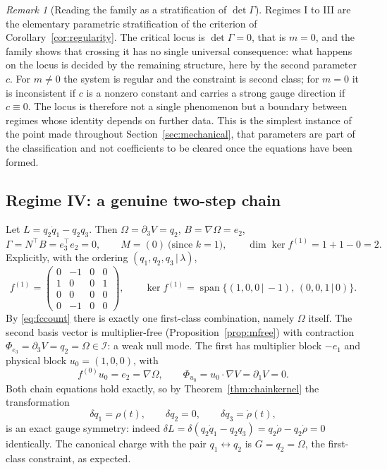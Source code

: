 \documentclass[12pt]{article}
\theoremstyle{plain}
\theoremstyle{definition}
\theoremstyle{remark}
\newtheorem{remark}[theorem]{Remark}
\DeclareMathOperator{\spn}{span}
\newcommand{\pd}[1]{\partial_{#1}}
\newcommand{\Om}{\Omega}
\newcommand{\Ical}{\mathcal{I}}
\begin{document}
	\begin{remark}[Reading the family as a stratification of $\det\Gamma$]
		\label{rem:familystrat}
		Regimes I to III are the elementary parametric stratification of the
		criterion of Corollary~\ref{cor:regularity}. The critical locus is
		$\det\Gamma=0$, that is $m=0$, and the family shows that crossing it has no
		single universal consequence: what happens on the locus is decided by the
		remaining structure, here by the second parameter $c$. For $m\neq0$ the
		system is regular and the constraint is second class; for $m=0$ it is
		inconsistent if $c$ is a nonzero constant and carries a strong gauge
		direction if $c\equiv0$. The locus is therefore not a single phenomenon but
		a boundary between regimes whose identity depends on further data. This is
		the simplest instance of the point made throughout
		Section~\ref{sec:mechanical}, that parameters are part of the classification
		and not coefficients to be cleared once the equations have been formed.
	\end{remark}
	
	\subsection{Regime IV: a genuine two-step chain}
	\label{sec:regimeIV}
	
	Let $L=q_{2}\dot q_{1}-q_{2}q_{3}$. Then $\Om=\pd{3}V=q_{2}$,
	$B=\nabla\Om=e_{2}$,
	\[
	\Gamma=N^{\top}B=e_{3}^{\top}e_{2}=0,
	\qquad
	M=(0)\ \text{(since }k=1),
	\qquad
	\dim\ker f^{(1)}=1+1-0=2 .
	\]
	Explicitly, with the ordering $(q_{1},q_{2},q_{3}\,|\,\lambda)$,
	\[
	f^{(1)}=\begin{pmatrix}0&-1&0&0\\1&0&0&1\\0&0&0&0\\0&-1&0&0\end{pmatrix},
	\qquad
	\ker f^{(1)}=\spn\{(1,0,0\,|\,-1),\,(0,0,1\,|\,0)\}.
	\]
	By \eqref{eq:fccount} there is exactly one first-class combination, namely $\Om$
	itself. The second basis vector is multiplier-free
	(Proposition~\ref{prop:mfree}) with contraction
	$\Phi_{e_{3}}=\pd{3}V=q_{2}=\Om\in\Ical$: a weak null mode. The first has
	multiplier block $-e_{1}$ and physical block $u_{0}=(1,0,0)$, with
	\[
	f^{(0)}u_{0}=e_{2}=\nabla\Om,
	\qquad
	\Phi_{u_{0}}=u_{0}\cdot\nabla V=\pd{1}V=0 .
	\]
	Both chain equations hold exactly, so by Theorem~\ref{thm:chainkernel} the
	transformation
	\begin{equation}
		\delta q_{1}=\rho(t),
		\qquad
		\delta q_{2}=0,
		\qquad
		\delta q_{3}=\dot\rho(t),
		\label{eq:chainIV}
	\end{equation}
	is an exact gauge symmetry: indeed
	$\delta L=\delta(q_{2}\dot q_{1}-q_{2}q_{3})
	=q_{2}\dot\rho-q_{2}\dot\rho=0$ identically. The canonical charge with the pair
	$q_{1}\leftrightarrow q_{2}$ is $G=q_{2}=\Om$, the first-class constraint, as
	expected.
	
\end{document}
